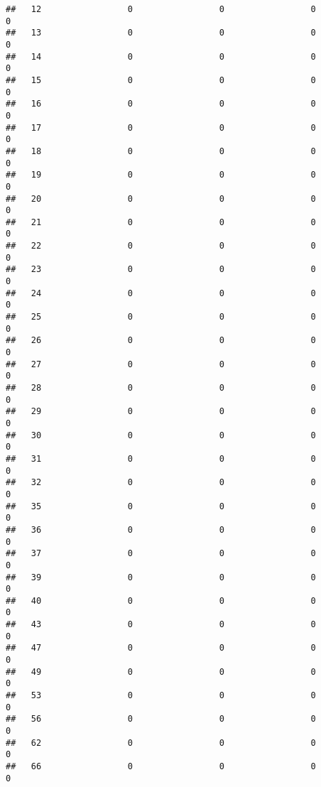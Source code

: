 \documentclass[]{article}
\begin{document}
\begin{verbatim}
##   12                 0                 0                 0                0
##   13                 0                 0                 0                0
##   14                 0                 0                 0                0
##   15                 0                 0                 0                0
##   16                 0                 0                 0                0
##   17                 0                 0                 0                0
##   18                 0                 0                 0                0
##   19                 0                 0                 0                0
##   20                 0                 0                 0                0
##   21                 0                 0                 0                0
##   22                 0                 0                 0                0
##   23                 0                 0                 0                0
##   24                 0                 0                 0                0
##   25                 0                 0                 0                0
##   26                 0                 0                 0                0
##   27                 0                 0                 0                0
##   28                 0                 0                 0                0
##   29                 0                 0                 0                0
##   30                 0                 0                 0                0
##   31                 0                 0                 0                0
##   32                 0                 0                 0                0
##   35                 0                 0                 0                0
##   36                 0                 0                 0                0
##   37                 0                 0                 0                0
##   39                 0                 0                 0                0
##   40                 0                 0                 0                0
##   43                 0                 0                 0                0
##   47                 0                 0                 0                0
##   49                 0                 0                 0                0
##   53                 0                 0                 0                0
##   56                 0                 0                 0                0
##   62                 0                 0                 0                0
##   66                 0                 0                 0                0

\end{verbatim}
\end{document}
